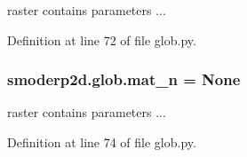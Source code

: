 raster contains parameters ... 



Definition at line 72 of file glob.\-py.

\hypertarget{namespacesmoderp2d_1_1glob_a374271c83af8083fa6a1b0f349f0b0bd}{
\subsubsection[{mat\-\_\-n}]{\setlength{\rightskip}{0pt plus 5cm}smoderp2d.\-glob.\-mat\-\_\-n = None}}\label{namespacesmoderp2d_1_1glob_a374271c83af8083fa6a1b0f349f0b0bd}


raster contains parameters ... 



Definition at line 74 of file glob.\-py.

